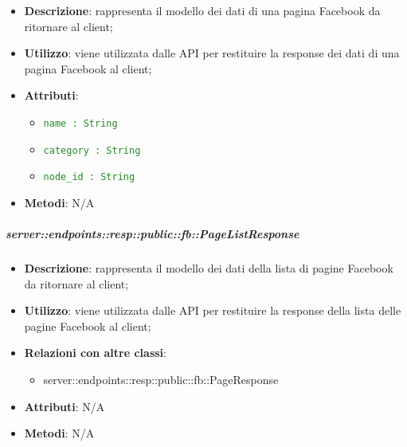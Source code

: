     \begin{itemize}
      \item \textbf{Descrizione}: rappresenta il modello dei dati di una pagina Facebook da ritornare al client;
      \item \textbf{Utilizzo}: viene utilizzata dalle API per restituire la response dei dati di una pagina Facebook al client;

    \item \textbf{Attributi}:
      \begin{itemize}
        \item \textcolor{forestgreen}{\texttt{name : String}}
        \item \textcolor{forestgreen}{\texttt{category : String}}
        \item \textcolor{forestgreen}{\texttt{node\_id : String}}
      \end{itemize}
    \item \textbf{Metodi}: N/A
      \end{itemize}

    \subparagraph{server::endpoints::resp::public::fb::PageListResponse} %
    \label{subp:bdsm_app_server_endpoints_resp_public_fb_pagelistresponse}
    \begin{itemize}
      \item \textbf{Descrizione}: rappresenta il modello dei dati della lista di pagine Facebook da ritornare al client;
      \item \textbf{Utilizzo}: viene utilizzata dalle API per restituire la response della lista delle pagine Facebook al client;
      \item \textbf{Relazioni con altre classi}:
        \begin{itemize}
          \item server::endpoints::resp::public::fb::PageResponse
        \end{itemize}
    \item \textbf{Attributi}: N/A
    \item \textbf{Metodi}: N/A
      \end{itemize}

